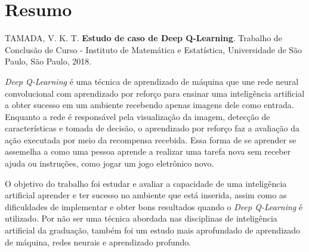 \chapter*{Resumo}
%
\noindent%
TAMADA, V. K. T. \textbf{Estudo de caso de Deep Q-Learning}. Trabalho de Conclusão de Curso
 - Instituto de Matemática e Estatística, Universidade de São Paulo,
São Paulo, 2018.
\bigskip

\textit{Deep Q-Learning} é uma técnica de aprendizado de máquina que une rede neural convolucional com aprendizado por reforço para ensinar uma inteligência artificial a obter sucesso em um ambiente recebendo apenas imagens dele como entrada.
Enquanto a rede é responsável pela visualização da imagem, detecção de características e tomada de decisão, o aprendizado por reforço faz a avaliação da ação executada por meio da recompensa recebida.
Essa forma de se aprender se assemelha a como uma pessoa aprende a realizar uma tarefa nova sem receber ajuda ou instruções, como jogar um jogo eletrônico novo.
\smallskip

O objetivo do trabalho foi estudar e avaliar a capacidade de uma inteligência artificial aprender e ter sucesso no ambiente que está inserida, assim como as dificuldades de implementar e obter bons resultados quando o \textit{Deep Q-Learning} é utilizado.
Por não ser uma técnica abordada nas disciplinas de inteligência artificial da graduação, também foi um estudo mais aprofundado de aprendizado de máquina, redes neurais e aprendizado profundo.
\smallskip

